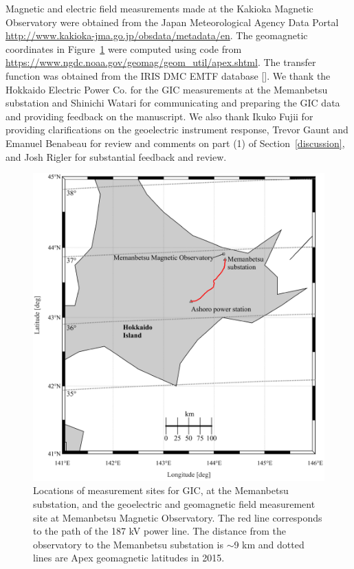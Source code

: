 \documentclass[draft,linenumbers]{agujournal2018}
\begin{document}
\acknowledgments
Magnetic and electric field measurements made at the Kakioka Magnetic Observatory were obtained from the Japan Meteorological Agency Data Portal \url{http://www.kakioka-jma.go.jp/obsdata/metadata/en}. The geomagnetic coordinates in Figure~\ref{map} were computed using code from \url{https://www.ngdc.noaa.gov/geomag/geom_util/apex.shtml}. The \cite{Fujii2015} transfer function was obtained from the IRIS DMC EMTF database [\cite{Kelbert2011}]. We thank the Hokkaido Electric Power Co. for the GIC measurements at the Memanbetsu substation and Shinichi Watari for communicating and preparing the GIC data and providing feedback on the manuscript. We also thank Ikuko Fujii for providing clarifications on the geoelectric instrument response, Trevor Gaunt and Emanuel Benabeau for review and comments on part (1) of Section~\ref{discussion}, and Josh Rigler for substantial feedback and review.

\begin{figure}[h]
  \centering
  \includegraphics[width=\textwidth]{figures/map.pdf}
  \caption{Locations of measurement sites for GIC, at the Memanbetsu substation, and the geoelectric and geomagnetic field measurement site at Memanbetsu Magnetic Observatory. The red line corresponds to the path of the 187 kV power line. The distance from the observatory to the Memanbetsu substation is $\sim$9 km and dotted lines are Apex geomagnetic latitudes \citep{Richmond1995} in 2015.}
  \label{map}
\end{figure}
\end{document}

